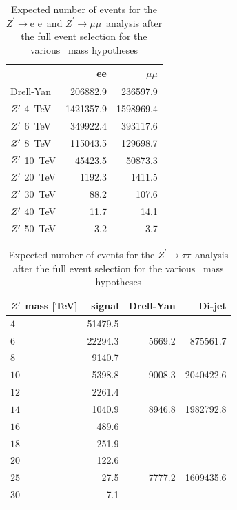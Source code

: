 \documentclass{cernrep}
\newcommand*{\Zptata}{\ensuremath{Z^{\prime}\rightarrow \tau\tau}}
\newcommand*{\Zpee}{\ensuremath{Z^{\prime}\rightarrow \text{e e}}}
\newcommand*{\Zpmumu}{\ensuremath{Z^{\prime}\rightarrow \mu\mu}}
\begin{document}
\begin{table}[htbp]
   \centering
\begin{tabular}{l|r|r}
 & ee & $\mu\mu$  \\
  \hline
  Drell-Yan & 206882.9 & 236597.9 \\
  \hline
  $Z^{\prime}$ 4~TeV & 1421357.9    & 1598969.4 \\
  $Z^{\prime}$ 6~TeV & 349922.4  & 393117.6\\
  $Z^{\prime}$ 8~TeV &   115043.5 & 129698.7 \\
  $Z^{\prime}$ 10~TeV &  45423.5 & 50873.3 \\
  $Z^{\prime}$ 20~TeV &  1192.3 & 1411.5\\
  $Z^{\prime}$ 30~TeV &  88.2 & 107.6\\
  $Z^{\prime}$ 40~TeV &  11.7 & 14.1 \\
  $Z^{\prime}$ 50~TeV &  3.2 & 3.7\\
\end{tabular}
  \caption{Expected number of events for the \Zpee\ and \Zpmumu\ analysis after the full event selection for the various \Zp\ mass hypotheses}
  \label{tab:leptonicresonances:yieldsll}
\end{table}

\begin{table}[htbp]
   \centering
\begin{tabular}{l| r |r|r}
$Z^{\prime}$ mass [TeV]  & signal &  Drell-Yan & Di-jet \\
  \hline
  $4$     &  51479.5 &  \multirow{3}{*}{5669.2} &   \multirow{3}{*}{875561.7} \\
  $6$     &  22294.3  & &\\
  $8$     &  9140.7  &  &\\
  \hline

  $10$      & 5398.8 & 9008.3 & 2040422.6 \\
  \hline

  $12$ &  2261.4&  \multirow{3}{*}{8946.8} &  \multirow{3}{*}{1982792.8}  \\
  $14$ &  1040.9&  &  \\
  \hline

  $16$ &  489.6&  \multirow{3}{*}{8826.3} &  \multirow{3}{*}{1915211.5} \\
  $18$ &  251.9&  &  \\
    \hline

  $20$    &  122.6& \multirow{3}{*}{7777.2} & \multirow{3}{*}{1609435.6}   \\
  $25$    &  27.5 &  &  \\
  $30$    &  7.1 &  &  \\
\end{tabular}
  \caption{Expected number of events for the \Zptata\ analysis after the full event selection for the various \Zp\ mass hypotheses}
  \label{tab:leptonicresonances:yieldstautau}
\end{table}
\end{document}
